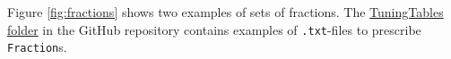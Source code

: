 \documentclass[a4paper]{article}
\begin{document}
\begin{appendices}
Figure \ref{fig:fractions} shows two examples of sets of fractions. The \href{https://github.com/teuncb/AdaptiveBarbershop/tree/main/TuningTables}{TuningTables folder} in the GitHub repository contains examples of \texttt{.txt}-files to prescribe \texttt{Fraction}s.

\end{appendices}
\end{document}

